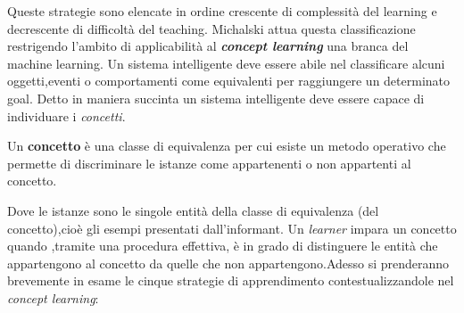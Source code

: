 Queste strategie sono elencate in ordine crescente di complessità del learning e decrescente di difficoltà del teaching.
Michalski attua questa classificazione restrigendo l'ambito di applicabilità al \textbf{\textit{concept learning}} una branca del machine learning. Un sistema intelligente deve essere abile nel classificare alcuni oggetti,eventi o comportamenti come equivalenti per raggiungere un determinato goal.  Detto in maniera succinta un sistema intelligente deve essere capace di individuare i \textit{concetti}.
\begin{definizione}
Un \textbf{concetto} è una classe di equivalenza  per cui esiste un metodo operativo che permette di discriminare le istanze come appartenenti o non appartenti al concetto.
\end{definizione} 
Dove le istanze sono le singole entità della classe di equivalenza (del concetto),cioè gli esempi  presentati dall'informant. Un \textit{learner} impara un concetto quando ,tramite una procedura effettiva, è in grado di distinguere le entità che appartengono al concetto da quelle che non appartengono.Adesso si prenderanno brevemente in esame le cinque strategie di apprendimento contestualizzandole nel \textit{concept learning}:
